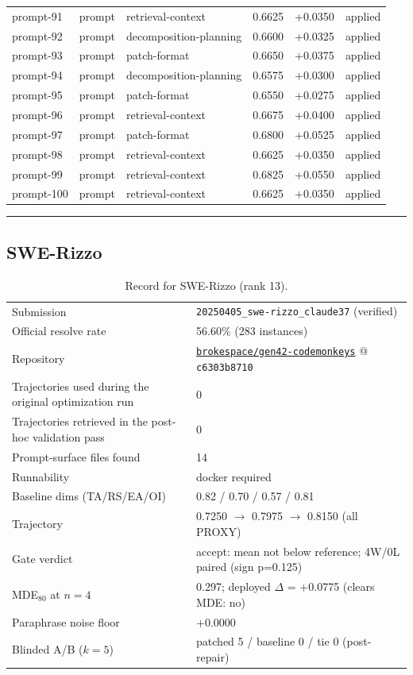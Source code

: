 \begin{center}
\begin{longtable}{llp{5.2cm}rrl}
prompt-91 & prompt & retrieval-context & 0.6625 & +0.0350 & applied \\
prompt-92 & prompt & decomposition-planning & 0.6600 & +0.0325 & applied \\
prompt-93 & prompt & patch-format & 0.6650 & +0.0375 & applied \\
prompt-94 & prompt & decomposition-planning & 0.6575 & +0.0300 & applied \\
prompt-95 & prompt & patch-format & 0.6550 & +0.0275 & applied \\
prompt-96 & prompt & retrieval-context & 0.6675 & +0.0400 & applied \\
prompt-97 & prompt & patch-format & 0.6800 & +0.0525 & applied \\
prompt-98 & prompt & retrieval-context & 0.6625 & +0.0350 & applied \\
prompt-99 & prompt & retrieval-context & 0.6825 & +0.0550 & applied \\
prompt-100 & prompt & retrieval-context & 0.6625 & +0.0350 & applied \\
\bottomrule\end{longtable}\end{center}
\par\bigskip\hrule\bigskip
\subsection{SWE-Rizzo}
\label{app:agent13}
\begin{table}[H]\centering\scriptsize
\caption{Record for SWE-Rizzo (rank 13).}
\begin{tabular}{lp{8.2cm}}\toprule
Submission & \texttt{20250405\_\allowbreak{}swe-rizzo\_\allowbreak{}claude37} (verified) \\
Official resolve rate & 56.60\% (283 instances) \\
Repository & \href{https://github.com/brokespace/gen42-codemonkeys}{\texttt{brokespace/gen42-codemonkeys}} @ \texttt{c6303b8710} \\
Trajectories used during the original optimization run & 0 \\
Trajectories retrieved in the post-hoc validation pass & 0 \\
Prompt-surface files found & 14 \\
Runnability & docker required \\
Baseline dims (TA/RS/EA/OI) & 0.82 / 0.70 / 0.57 / 0.81 \\
Trajectory & 0.7250 $\to$ 0.7975 $\to$ 0.8150 (all PROXY) \\
Gate verdict & accept: mean not below reference; 4W/0L paired (sign p=0.125) \\
MDE$_{80}$ at $n{=}4$ & 0.297; deployed $\Delta$ = +0.0775 (clears MDE: no) \\
Paraphrase noise floor & +0.0000 \\
Blinded A/B ($k{=}5$) & patched 5 / baseline 0 / tie 0 (post-repair) \\
\bottomrule\end{tabular}\end{table}
